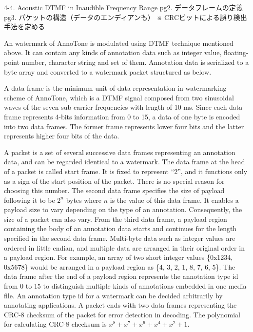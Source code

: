 4-4. Acoustic DTMF in Inaudible Frequency Range
	pg2. データフレームの定義
	pg3. パケットの構造（データのエンディアンも）
	※ CRCビットによる誤り検出手法を定める
\fi

An watermark of AnnoTone is modulated using DTMF technique mentioned above.
It can contain any kinds of annotation data such as integer value, floating-point number, character string and set of them.
Annotation data is serialized to a byte array and converted to a watermark packet structured as below.

A data frame is the minimum unit of data representation in watermarking scheme of AnnoTone, which is a DTMF signal composed from two sinusoidal waves of the seven sub-carrier frequencies with length of 10 ms.
Since each data frame represents 4-bits information from 0 to 15, a data of one byte is encoded into two data frames.
The former frame represents lower four bits and the latter represents higher four bits of the data.


A packet is a set of several successive data frames representing an annotation data, and can be regarded identical to a watermark.
The data frame at the head of a packet is called start frame. It is fixed to represent ``2'', and it functions only as a sign of the start position of the packet. There is no special reason for choosing this number.
The second data frame specifies the size of payload following it to be $ 2^n $ bytes where $n$ is the value of this data frame. It enables a payload size to vary depending on the type of an annotation. Consequently, the size of a packet can also vary.
From the third data frame, a payload region containing the body of an annotation data starts and continues for the length specified in the second data frame.
Multi-byte data such as integer values are ordered in little endian, and multiple data are arranged in their original order in a payload region.
For example, an array of two short integer values \{0x1234, 0x5678\} would be arranged in a payload region as \{4, 3, 2, 1, 8, 7, 6, 5\}.
The data frame after the end of a payload region represents the annotation type id from 0 to 15 to distinguish multiple kinds of annotations embedded in one media file.
An annotation type id for a watermark can be decided arbitrarily by annotating applications.
A packet ends with two data frames representing the CRC-8 checksum of the packet for error detection in decoding. The polynomial for calculating CRC-8 checksum is $x^8 + x^7 + x^6 + x^4 + x^2 + 1$.
